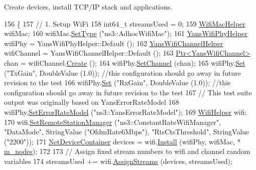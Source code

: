 Create devices, install T\+C\+P/\+IP stack and applications. 


\begin{DoxyCode}
156 \{
157   \textcolor{comment}{// 1. Setup WiFi}
158   int64\_t streamsUsed = 0;
159   \hyperlink{classns3_1_1WifiMacHelper}{WifiMacHelper} wifiMac;
160   wifiMac.\hyperlink{classns3_1_1WifiMacHelper_a382d8df76a1dd7007179d1963b4b6bc6}{SetType} (\textcolor{stringliteral}{"ns3::AdhocWifiMac"});
161   \hyperlink{classns3_1_1YansWifiPhyHelper}{YansWifiPhyHelper} wifiPhy = YansWifiPhyHelper::Default ();
162   \hyperlink{classns3_1_1YansWifiChannelHelper}{YansWifiChannelHelper} wifiChannel = YansWifiChannelHelper::Default ();
163   \hyperlink{classns3_1_1Ptr}{Ptr<YansWifiChannel>} chan = wifiChannel.\hyperlink{classns3_1_1YansWifiChannelHelper_a0532e292ab9452f3cf630c848708e563}{Create} ();
164   wifiPhy.\hyperlink{classns3_1_1YansWifiPhyHelper_ad2e9a27587dd4ff320435c93cc2676de}{SetChannel} (chan);
165   wifiPhy.\hyperlink{classns3_1_1WifiPhyHelper_a2527d6d7b29f717fd7436166c5f05f1a}{Set} (\textcolor{stringliteral}{"TxGain"}, DoubleValue (1.0)); \textcolor{comment}{//this configuration should go away in future revision to
       the test}
166   wifiPhy.\hyperlink{classns3_1_1WifiPhyHelper_a2527d6d7b29f717fd7436166c5f05f1a}{Set} (\textcolor{stringliteral}{"RxGain"}, DoubleValue (1.0)); \textcolor{comment}{//this configuration should go away in future revision to
       the test}
167   \textcolor{comment}{// This test suite output was originally based on YansErrorRateModel}
168   wifiPhy.\hyperlink{classns3_1_1WifiPhyHelper_a219d3ae5881842aa42ea341b985ce114}{SetErrorRateModel} (\textcolor{stringliteral}{"ns3::YansErrorRateModel"}); 
169   \hyperlink{classns3_1_1WifiHelper}{WifiHelper} wifi;
170   wifi.\hyperlink{classns3_1_1WifiHelper_a3d01b178aeb2de246ab5a3aa5638ce24}{SetRemoteStationManager} (\textcolor{stringliteral}{"ns3::ConstantRateWifiManager"}, \textcolor{stringliteral}{"DataMode"}, 
      StringValue (\textcolor{stringliteral}{"OfdmRate6Mbps"}), \textcolor{stringliteral}{"RtsCtsThreshold"}, StringValue (\textcolor{stringliteral}{"2200"}));
171   \hyperlink{classns3_1_1NetDeviceContainer}{NetDeviceContainer} devices = wifi.\hyperlink{classns3_1_1WifiHelper_a451b3d33fa1497c22f06c5451f57a127}{Install} (wifiPhy, wifiMac, *
      \hyperlink{classChainRegressionTest_a9df3157b70f521bddeb6184f0e7c48a3}{m\_nodes}); 
172 
173   \textcolor{comment}{// Assign fixed stream numbers to wifi and channel random variables}
174   streamsUsed += wifi.\hyperlink{classns3_1_1WifiHelper_ab29bf13f8726c2e0807a583bfea79777}{AssignStreams} (devices, streamsUsed);

\end{DoxyCode}
